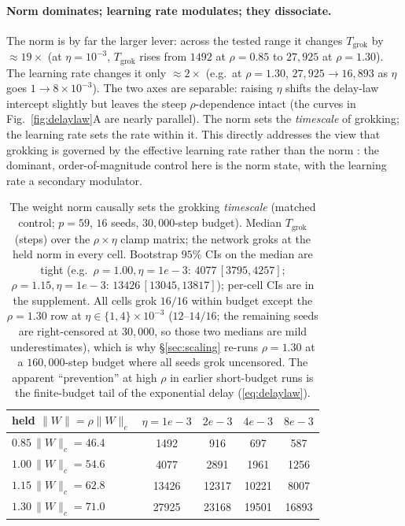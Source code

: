 \documentclass[10pt,twocolumn]{article}
\newcommand{\Wc}{\|W\|_{c}}
\newcommand{\Tgrok}{T_{\mathrm{grok}}}
\begin{document}
\paragraph{Norm dominates; learning rate modulates; they dissociate.}
The norm is by far the larger lever: across the tested range it changes $\Tgrok$ by $\approx\!19\times$
(at $\eta=10^{-3}$, $\Tgrok$ rises from $1492$ at $\rho=0.85$ to $27{,}925$ at $\rho=1.30$). The learning
rate changes it only $\approx\!2\times$ (e.g.\ at $\rho=1.30$, $27{,}925\!\to\!16{,}893$ as $\eta$ goes
$1\!\to\!8\times10^{-3}$). The two axes are separable: raising $\eta$ shifts the delay-law intercept
slightly but leaves the steep $\rho$-dependence intact (the curves in Fig.~\ref{fig:delaylaw}A are nearly
parallel). The norm sets the \emph{timescale} of grokking; the learning rate sets the rate within it. This
directly addresses the view that grokking is governed by the effective learning rate rather than the norm
\citep{nonstationarity2025}: the dominant, order-of-magnitude control here is the norm state, with the
learning rate a secondary modulator.

\begin{table}[t]
\centering\small
\caption{The weight norm causally sets the grokking \emph{timescale} (matched control; $p=59$, $16$ seeds,
$30{,}000$-step budget). Median $\Tgrok$ (steps) over the $\rho\times\eta$ clamp matrix; the network groks
at the held norm in every cell. Bootstrap $95\%$ CIs on the median are tight (e.g.\ $\rho{=}1.00,\eta{=}1e{-}3$:
$4077\,[3795,4257]$; $\rho{=}1.15,\eta{=}1e{-}3$: $13426\,[13045,13817]$); per-cell CIs are in the
supplement. All cells grok $16/16$ within budget except the $\rho{=}1.30$ row at $\eta\in\{1,4\}\times10^{-3}$
($12$--$14/16$; the remaining seeds are right-censored at $30{,}000$, so those two medians are mild
underestimates), which is why \S\ref{sec:scaling} re-runs $\rho{=}1.30$ at a $160{,}000$-step budget where
all seeds grok uncensored. The apparent ``prevention'' at high $\rho$ in earlier short-budget runs is the
finite-budget tail of the exponential delay (\ref{eq:delaylaw}).}
\label{tab:causal}
\begin{tabular}{lcccc}
\toprule
held $\|W\|=\rho\Wc$ & $\eta{=}1e{-}3$ & $2e{-}3$ & $4e{-}3$ & $8e{-}3$ \\
\midrule
$0.85\,\Wc=46.4$ & 1492 & 916 & 697 & 587 \\
$1.00\,\Wc=54.6$ & 4077 & 2891 & 1961 & 1256 \\
$1.15\,\Wc=62.8$ & 13426 & 12317 & 10221 & 8007 \\
$1.30\,\Wc=71.0$ & 27925 & 23168 & 19501 & 16893 \\
\bottomrule
\end{tabular}
\end{table}
\end{document}

